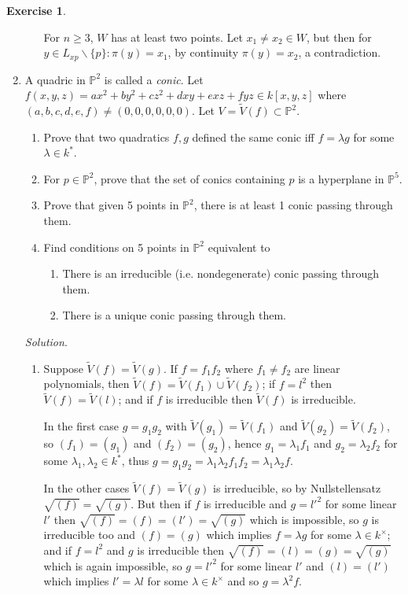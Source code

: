 \documentclass{article}
\newcommand{\p}{\mathbb{P}}
\theoremstyle{definition}
\newtheorem{exe}[defn]{Exercise}
\begin{document}
\begin{exe}
\begin{enumerate}
\begin{enumerate}
For $n\geq 3$, $W$ has at least two points. Let $x_1\neq x_2\in W$, but then for $y\in L_{xp}\backslash\{p\}:\pi(y)=x_1$, by continuity $\pi(y)=x_2$, a contradiction.
\end{enumerate}
\item A quadric in $\p^2$ is called a \textit{conic}. Let $f(x,y,z)=ax^2+by^2+cz^2+dxy+exz+fyz\in k[x,y,z]$ where $(a,b,c,d,e,f)\neq (0,0,0,0,0,0)$. Let $V=\widetilde V(f)\subset\p^2$.
\begin{enumerate}
\item Prove that two quadratics $f,g$ defined the same conic iff $f=\lambda g$ for some $\lambda\in k^\ast$.
\item For $p\in\p^2$, prove that the set of conics containing $p$ is a hyperplane in $\p^5$.
\item Prove that given 5 points in $\p^2$, there is at least 1 conic passing through them.
\item Find conditions on 5 points in $\p^2$ equivalent to
\begin{enumerate}
\item There is an irreducible (i.e. nondegenerate) conic passing through them.
\item There is a unique conic passing through them.
\end{enumerate}
\end{enumerate}

\textit{Solution}. \begin{enumerate}
\item Suppose $\widetilde V(f)=\widetilde V(g)$. If $f=f_1f_2$ where $f_1\neq f_2$ are linear polynomials, then $\widetilde V(f)=\widetilde V(f_1)\cup \widetilde V(f_2)$; if $f=l^2$ then $\widetilde V(f)=\widetilde V(l)$; and if $f$ is irreducible then $\widetilde V(f)$ is irreducible.

In the first case $g=g_1g_2$ with $\widetilde V(g_1)=\widetilde V(f_1)$ and $\widetilde V(g_2)=\widetilde V(f_2)$, so $(f_1)=(g_1)$ and $(f_2)=(g_2)$, hence $g_1=\lambda_1 f_1$ and $g_2=\lambda_2 f_2$ for some $\lambda_1,\lambda_2\in k^\ast$, thus $g=g_1g_2=\lambda_1\lambda_2 f_1f_2=\lambda_1\lambda_2 f$.

In the other cases $\widetilde V(f)=\widetilde V(g)$ is irreducible, so by Nullstellensatz $\sqrt{(f)}=\sqrt{(g)}$. But then if $f$ is irreducible and $g=l'^2$ for some linear $l'$ then $\sqrt{(f)}=(f)=(l')=\sqrt{(g)}$ which is impossible, so $g$ is irreducible too and $(f)=(g)$ which implies $f=\lambda g$ for some $\lambda\in k^\times$; and if $f=l^2$ and $g$ is irreducible then $\sqrt{(f)}=(l)=(g)=\sqrt{(g)}$ which is again impossible, so $g=l'^2$ for some linear $l'$ and $(l)=(l')$ which implies $l'=\lambda l$ for some $\lambda\in k^\times$ and so $g=\lambda^2 f$.


\end{enumerate}
\end{enumerate}
\end{exe}
\end{document}
